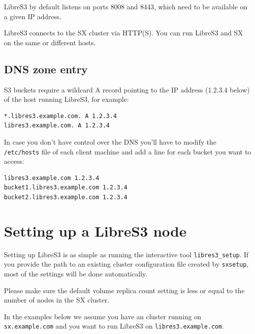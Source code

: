 LibreS3 by default listens on ports 8008 and 8443, which need to be available on a given
IP address.

LibreS3 connects to the SX cluster via HTTP(S). You can run LibreS3 and SX
on the same or different hosts.

\subsection*{DNS zone entry}

S3 buckets require a wildcard A record pointing to the IP address (1.2.3.4 below) of the
host running LibreS3, for example:
\small
\begin{lstlisting}
*.libres3.example.com. A 1.2.3.4
libres3.example.com. A 1.2.3.4
\end{lstlisting}
\LARGE

In case you don't have control over the DNS you'll have to modify the \verb|/etc/hosts| file
of each client machine and add a line for each bucket you want to access:
\small
\begin{lstlisting}
libres3.example.com 1.2.3.4
bucket1.libres3.example.com 1.2.3.4
bucket2.libres3.example.com 1.2.3.4
\end{lstlisting}
\LARGE

\section*{Setting up a LibreS3 node}

Setting up LibreS3 is as simple as running the interactive tool \verb+libres3_setup+.
If you provide the path to an existing \SX cluster configuration file created
by \verb+sxsetup+, most of the settings will be done automatically.

Please make sure the default volume replica count setting is less or equal
to the number of nodes in the SX cluster.

In the examples below we assume you
have an \SX cluster running on \verb|sx.example.com| and you want to run
LibreS3 on \verb|libres3.example.com|.

